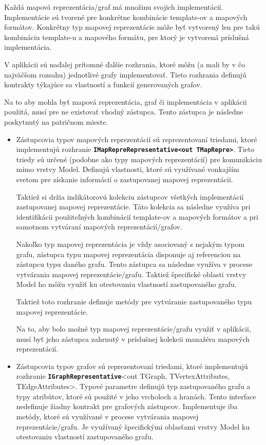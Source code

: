 Každá mapová reprezentácia/graf má množinu svojich implementácií. Implementácie sú tvorené pre konkrétne kombinácie template-ov a mapových formátov. Konkrétny typ mapovej reprezentácie môže byť vytvorený len pre takú kombináciu template-u a mapového formátu, pre ktorý je vytvorená príslušná implementácia.

V aplikácii sú naďalej prítomné ďalšie rozhrania, ktoré môžu (a mali by v čo najväčšom rozsahu) jednotlivé grafy implementovať. Tieto rozhrania definujú kontrakty týkajúce sa vlastností a funkcií generovaných grafov.

\bigskip

Na to aby mohla byť mapová reprezentácia, graf či implementácia v aplikácii použitá, musí pre ne existovať vhodný zástupca. Tento zástupca je následne poskytnutý na patričnom mieste.
\begin{itemize}
    \item Zástupcovia typov mapových reprezentácií sú reprezentovaní triedami, ktoré implementujú rozhranie \textbf{\texttt{IMapRepreRepresentative<out TMapRepre>}}. Tieto triedy sú určené (podobne ako typy mapových reprezentácií) pre komunikáciu mimo vrstvy Model. Definujú vlastnosti, ktoré sú využívané vonkajším svetom pre získanie informácií o zastupovanej mapovej reprezentácii. 
    
    Taktiež si držia indikátorovú kolekciu zástupcov všetkých implementácií zastupovanej mapovej reprezentácie. Táto kolekcia sa následne využíva pri identifikácii použiteľných kombinácií template-ov a mapových formátov a pri samotnom vytváraní mapových reprezentácií/grafov.
    
    Nakoľko typ mapovej reprezentácia je vždy asociovaný s nejakým typom grafu, zástupca typu mapovej reprezentácia disponuje aj referenciou na zástupcu typu daného grafu. Tento zástupca sa následne využíva v procese vytvárania mapovej reprezentácie/grafu. Taktiež špecifické oblasti vrstvy Model ho môžu využiť ku otestovaniu vlastností zastupovaného grafu.

    Taktiež toto rozhranie definuje metódy pre vytváranie zastupovaného typu mapovej reprezentácie. 

    Na to, aby bolo možné typ mapovej reprezentácie/grafu využiť v aplikácii, musí byť jeho zástupca zahrnutý v príslušnej kolekcii manažéra mapových reprezentácií.

    \item Zástupcovia typov grafov sú reprezentovaní triedami, ktoré implementujú rozhranie \textbf{\texttt{IGraphRepresentative}}<out TGraph, TVertexAttributes, TEdgeAttributes>. Typové parametre definujú typ zastupovaného grafu a typy atribútov, ktoré sú použité v jeho vrcholoch a hranách. Tento interface nedefinuje žiadny kontrakt pre grafových zástupcov. Implementuje iba metódy, ktoré sú využívané v procese vytvárania mapovej reprezentácie/grafu. Je využívaný špecifickými oblasťami vrstvy Model ku otestovaniu vlastností zastupovaného grafu.


\end{itemize}
